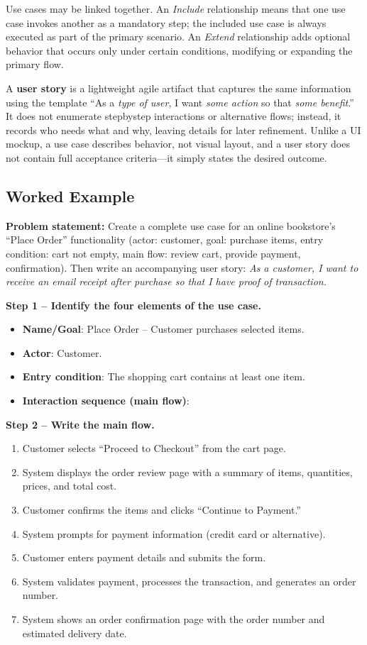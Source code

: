 \documentclass[12pt, a4paper]{article}
\begin{document}
Use cases may be linked together. An \emph{Include} relationship means that one use case invokes another as a mandatory step; the included use case is always executed as part of the primary scenario. An \emph{Extend} relationship adds optional behavior that occurs only under certain conditions, modifying or expanding the primary flow.

A \textbf{user story} is a lightweight agile artifact that captures the same information using the template ``As a \emph{type of user}, I want \emph{some action} so that \emph{some benefit}.''
It does not enumerate stepbystep interactions or alternative flows; instead, it records who needs what and why, leaving details for later refinement. Unlike a UI mockup, a use case describes behavior, not visual layout, and a user story does not contain full acceptance criteria---it simply states the desired outcome.

\subsection{Worked Example}
\textbf{Problem statement:} Create a complete use case for an online bookstore's ``Place Order'' functionality (actor: customer, goal: purchase items, entry condition: cart not empty, main flow: review cart, provide payment, confirmation). Then write an accompanying user story: \emph{As a customer, I want to receive an email receipt after purchase so that I have proof of transaction.}

\textbf{Step 1 -- Identify the four elements of the use case.}
\begin{itemize}
  \item \textbf{Name/Goal}: Place Order -- Customer purchases selected items.
  \item \textbf{Actor}: Customer.
  \item \textbf{Entry condition}: The shopping cart contains at least one item.
  \item \textbf{Interaction sequence (main flow)}:
\end{itemize}

\textbf{Step 2 -- Write the main flow.}
\begin{enumerate}
  \item Customer selects ``Proceed to Checkout'' from the cart page.
  \item System displays the order review page with a summary of items, quantities, prices, and total cost.
  \item Customer confirms the items and clicks ``Continue to Payment.''
  \item System prompts for payment information (credit card or alternative).
  \item Customer enters payment details and submits the form.
  \item System validates payment, processes the transaction, and generates an order number.
  \item System shows an order confirmation page with the order number and estimated delivery date.
\end{enumerate}
\end{document}
